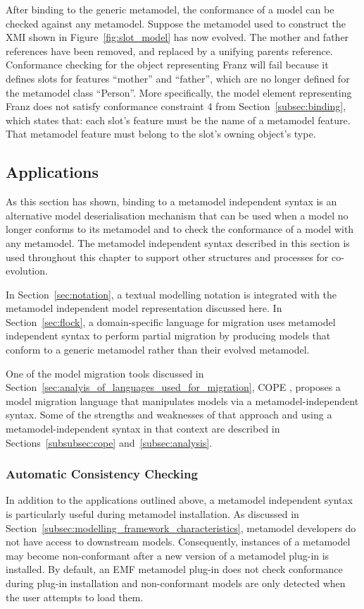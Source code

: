 After binding to the generic metamodel, the conformance of a model can be checked against any metamodel. Suppose the metamodel used to construct the XMI shown in Figure~\ref{fig:slot_model} has now evolved. The mother and father references have been removed, and replaced by a unifying parents reference. Conformance checking for the object representing Franz will fail because it defines slots for features ``mother'' and ``father'', which are no longer defined for the metamodel class ``Person''. More specifically, the model element representing Franz does not satisfy conformance constraint 4 from Section~\ref{subsec:binding}, which states that: each slot's feature must be the name of a metamodel feature. That metamodel feature must belong to the slot's owning object's type. 

\subsection{Applications}
As this section has shown, binding to a metamodel independent syntax is an alternative model deserialisation mechanism that can be used when a model no longer conforms to its metamodel and to check the conformance of a model with any metamodel. The metamodel independent syntax described in this section is used throughout this chapter to support other structures and processes for co-evolution.

In Section~\ref{sec:notation}, a textual modelling notation is integrated with the metamodel independent model representation discussed here. In Section~\ref{sec:flock}, a domain-specific language for migration uses metamodel independent syntax to perform partial migration by producing models that conform to a generic metamodel rather than their evolved metamodel.

One of the model migration tools discussed in Section~\ref{sec:analyis_of_languages_used_for_migration}, COPE \cite{herrmannsdoerfer09cope}, proposes a model migration language that manipulates models via a metamodel-independent syntax. Some of the strengths and weaknesses of that approach and using a metamodel-independent syntax in that context are described in Sections~\ref{subsubsec:cope} and~\ref{subsec:analysis}.


\subsubsection{Automatic Consistency Checking}
\label{subsec:automatic_checking}
In addition to the applications outlined above, a metamodel independent syntax is particularly useful during metamodel installation. As discussed in Section~\ref{subsec:modelling_framework_characteristics}, metamodel developers do not have access to downstream models. Consequently, instances of a metamodel may become non-conformant after a new version of a metamodel plug-in is installed. By default, an EMF metamodel plug-in does not check conformance during plug-in installation and non-conformant models are only detected when the user attempts to load them.

